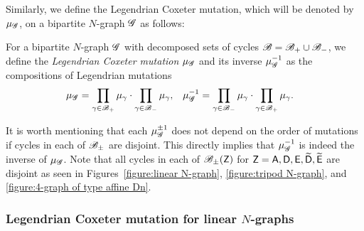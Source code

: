 Similarly, we define the Legendrian Coxeter mutation, which will be denoted by $\mu_\mathscr{G}$, on a bipartite $N$-graph $\mathscr{G}$ as follows:
\begin{definition}
For a bipartite $N$-graph $\mathscr{G}$ with decomposed sets of cycles $\mathscr{B}=\mathscr{B}_+\cup\mathscr{B}_-$, we define the \emph{Legendrian Coxeter mutation} $\mu_\mathscr{G}$ and its inverse $\mu_\mathscr{G}^{-1}$ as the compositions of Legendrian mutations
\begin{align*}
\mu_\mathscr{G}&=\prod_{\gamma\in \mathscr{B}_+}\mu_\gamma \cdot \prod_{\gamma\in \mathscr{B}_-}\mu_\gamma,&
\mu_\mathscr{G}^{-1}&=\prod_{\gamma\in \mathscr{B}_-}\mu_\gamma \cdot \prod_{\gamma\in \mathscr{B}_+}\mu_\gamma.
\end{align*}
\end{definition}

It is worth mentioning that each $\mu_\mathscr{G}^{\pm1}$ does not depend on the order of mutations if cycles in each of $\mathscr{B}_\pm$ are disjoint. 
This directly implies that $\mu_\mathscr{G}^{-1}$ is indeed the inverse of 
$\mu_\mathscr{G}$. Note that all cycles in each of $\mathscr{B}_\pm(\mathsf{Z})$ for $\mathsf{Z} =\mathsf{A},\mathsf{D},\mathsf{E},\widetilde{\mathsf{D}}, \widetilde{\mathsf{E}}$ are disjoint as seen in Figures~\ref{figure:linear N-graph}, \ref{figure:tripod N-graph}, and \ref{figure:4-graph of type affine Dn}.


\subsubsection{Legendrian Coxeter mutation for linear $N$-graphs}

